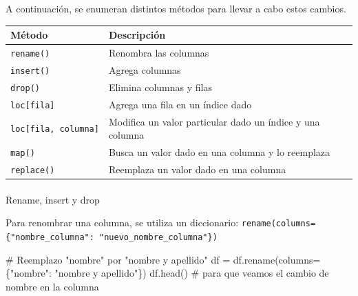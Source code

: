 \documentclass[
  letterpaper,
  DIV=11,
  numbers=noendperiod]{scrreprt}
\makeatletter
\let\oldparagraph\paragraph
\renewcommand{\paragraph}{
    \@ifstar
      \xxxParagraphStar
      \xxxParagraphNoStar
  }
\newcommand{\xxxParagraphStar}[1]{\oldparagraph*{#1}\mbox{}}
\newcommand{\xxxParagraphNoStar}[1]{\oldparagraph{#1}\mbox{}}
\newenvironment{Shaded}{\begin{snugshade}}{\end{snugshade}}
\newcommand{\CommentTok}[1]{\textcolor[rgb]{0.37,0.37,0.37}{#1}}
\newcommand{\NormalTok}[1]{\textcolor[rgb]{0.00,0.23,0.31}{#1}}
\newcommand{\OperatorTok}[1]{\textcolor[rgb]{0.37,0.37,0.37}{#1}}
\newcommand{\StringTok}[1]{\textcolor[rgb]{0.13,0.47,0.30}{#1}}
\makeatother
\begin{document}
A continuación, se enumeran distintos métodos para llevar a cabo estos
cambios.

\begin{longtable}[]{@{}
  >{\raggedright\arraybackslash}p{}
  >{\raggedright\arraybackslash}p{}@{}}
\toprule\noalign{}
\begin{minipage}[b]{\linewidth}\raggedright
Método
\end{minipage} & \begin{minipage}[b]{\linewidth}\raggedright
Descripción
\end{minipage} \\
\midrule\noalign{}
\endhead
\bottomrule\noalign{}
\endlastfoot
\texttt{rename()} & Renombra las columnas \\
\texttt{insert()} & Agrega columnas \\
\texttt{drop()} & Elimina columnas y filas \\
\texttt{loc{[}fila{]}} & Agrega una fila en un índice dado \\
\texttt{loc{[}fila,\ columna{]}} & Modifica un valor particular dado un
índice y una columna \\
\texttt{map()} & Busca un valor dado en una columna y lo reemplaza \\
\texttt{replace()} & Reemplaza un valor dado en una columna \\
\end{longtable}

\paragraph{Rename, insert y drop}\label{rename-insert-y-drop}

Para renombrar una columna, se utiliza un diccionario:
\texttt{rename(columns=\{"nombre\_columna":\ "nuevo\_nombre\_columna"\})}

\begin{Shaded}
\begin{Highlighting}[]
\CommentTok{\# Reemplazo "nombre" por "nombre y apellido"}
\NormalTok{df }\OperatorTok{=}\NormalTok{ df.rename(columns}\OperatorTok{=}\NormalTok{\{}\StringTok{"nombre"}\NormalTok{: }\StringTok{"nombre y apellido"}\NormalTok{\})}
\NormalTok{df.head() }\CommentTok{\# para que veamos el cambio de nombre en la columna}
\end{Highlighting}
\end{Shaded}
\end{document}
